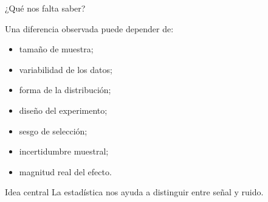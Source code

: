 \documentclass[aspectratio=169,11pt]{beamer}
\begin{document}
\begin{frame}{¿Qué nos falta saber?}

Una diferencia observada puede depender de:

\begin{itemize}

    \item tamaño de muestra;

    \item variabilidad de los datos;

    \item forma de la distribución;

    \item diseño del experimento;

    \item sesgo de selección;

    \item incertidumbre muestral;

    \item magnitud real del efecto.

\end{itemize}

\vspace{0.4cm}

\begin{block}{Idea central}
La estadística nos ayuda a distinguir entre señal y ruido.
\end{block}

\end{frame}

\end{document}
